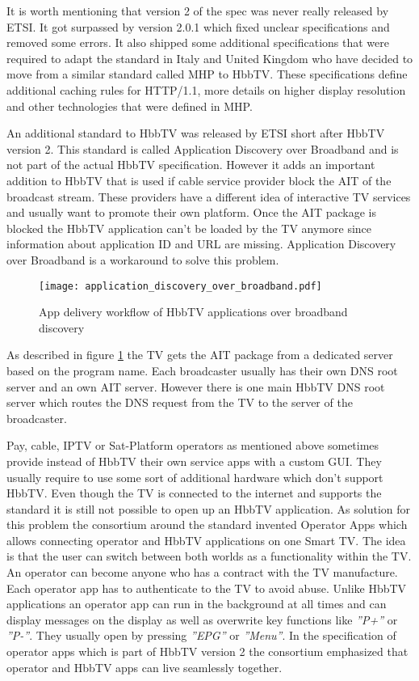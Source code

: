 It is worth mentioning that version 2 of the spec was never really released by ETSI. It got
surpassed by version 2.0.1 which fixed unclear specifications and removed some errors. It also
shipped some additional specifications that were required to adapt the standard in Italy and United
Kingdom who have decided to move from a similar standard called MHP to HbbTV. These specifications
define additional caching rules for HTTP/1.1, more details on higher display resolution and other
technologies that were defined in MHP.

An additional standard to HbbTV was released by ETSI short after HbbTV version 2. This standard is
called Application Discovery over Broadband and is not part of the actual HbbTV specification.
However it adds an important addition to HbbTV that is used if cable service provider block
the AIT of the broadcast stream. These providers have a different idea of interactive TV services
and usually want to promote their own platform. Once the AIT package is blocked the HbbTV application
can't be loaded by the TV anymore since information about application ID and URL are missing.
Application Discovery over Broadband is a workaround to solve this problem.

\begin{figure}[htb]
  \centering
  \texttt{[image: application\_discovery\_over\_broadband.pdf]}\\
  \caption{App delivery workflow of HbbTV applications over broadband discovery}\label{fig:application_discovery_over_broadband}
\end{figure}

As described in figure \ref{fig:application_discovery_over_broadband} the TV gets the AIT package
from a dedicated server based on the program name. Each broadcaster usually has their own DNS
root server and an own AIT server. However there is one main HbbTV DNS root server which routes the
DNS request from the TV to the server of the broadcaster.

Pay, cable, IPTV or Sat-Platform operators as mentioned above sometimes provide instead of HbbTV
their own service apps with a custom GUI. They usually require to use some sort of additional hardware which
don't support HbbTV. Even though the TV is connected to the internet and supports the standard
it is still not possible to open up an HbbTV application. As solution for this problem the
consortium around the standard invented Operator Apps which allows connecting operator and HbbTV
applications on one Smart TV. The idea is that the user can switch between both worlds as a
functionality within the TV. An operator can become anyone who has a contract with the TV
manufacture. Each operator app has to authenticate to the TV to avoid abuse. Unlike HbbTV
applications an operator app can run in the background at all times and can display messages on
the display as well as overwrite key functions like \textit{''P+''} or \textit{''P-''}. They
usually open by pressing \textit{''EPG''} or \textit{''Menu''}. In the specification of operator
apps which is part of HbbTV version 2 the consortium emphasized that operator and HbbTV apps can
live seamlessly together.

